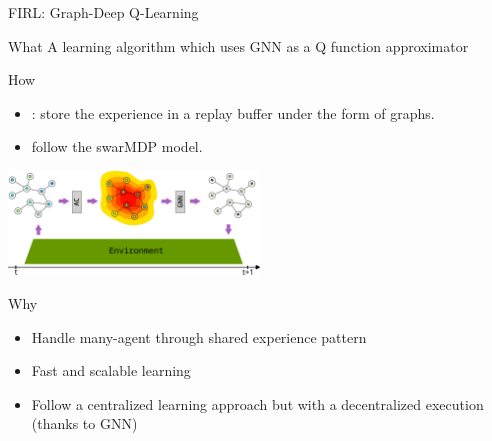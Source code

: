 \documentclass[presentation, 8pt,169]{beamer}\mode<presentation>{\usetheme{AMSBolognaFC}}
\begin{document}
\begin{frame}{FIRL: Graph-Deep Q-Learning}
  \begin{block}{What}
    A learning algorithm which uses GNN as a Q function approximator
  \end{block}
  \begin{block}{How}
    \begin{itemize}
      \item {}: store the experience in a replay buffer under the form of graphs.
      \item {} follow the swarMDP model.
    \end{itemize}
    \centering
    \includegraphics[width=0.5\textwidth]{img/architecture.pdf}
  
  \end{block}
  \begin{alertblock}{Why}
    \begin{itemize}
      \item Handle many-agent through shared experience pattern 
      \item Fast and scalable learning 
      \item Follow a centralized learning approach but with a decentralized execution (thanks to GNN)
    \end{itemize}
  \end{alertblock}
\end{frame}
\end{document}
